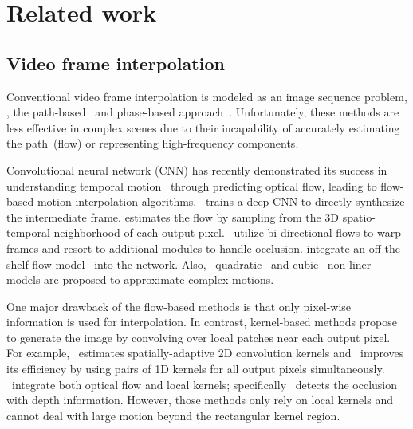 \documentclass[final]{cvpr}
\begin{document}
\section{Related work}


\subsection{Video frame interpolation}



Conventional video frame interpolation is modeled as an image sequence problem, \eg, the path-based~\cite{mahajan2009moving} and phase-based approach~\cite{meyer2018phasenet,meyer2015phase}. Unfortunately, these methods are less effective in complex scenes due to their incapability of accurately estimating the path~(flow) or representing high-frequency components.

Convolutional neural network (CNN) has recently demonstrated its success in understanding temporal motion~\cite{dosovitskiy2015flownet,ilg2017flownet,raket2012motion,sun2018pwc,weinzaepfel2013deepflow,werlberger2011optical} through predicting optical flow, leading to flow-based motion interpolation algorithms. \cite{long2016learning}~trains a deep CNN to directly synthesize the intermediate frame. \cite{liu2017video} estimates the flow by sampling from the 3D spatio-temporal neighborhood of each output pixel. \cite{jiang2018super,park2020bmbc,xue2019video,yuan2019zoom}~utilize bi-directional flows to warp frames and resort to additional modules to handle occlusion. \cite{niklaus2018context,niklaus2020softmax} integrate an off-the-shelf flow model~\cite{sun2018pwc} into the network.
Also, ~quadratic~\cite{liu2020enhanced,xu2019quadratic} and cubic~\cite{chi2020all} non-liner models are proposed to approximate complex motions.


One major drawback of the flow-based methods is that only pixel-wise information is used for interpolation. 
In contrast, kernel-based methods propose to generate the image by convolving over local patches near each output pixel. For example, \cite{niklaus2017video_sepcov}~estimates  spatially-adaptive 2D convolution kernels and \cite{niklaus2017video}~improves its efficiency by using pairs of 1D kernels for all output pixels simultaneously.
\cite{bao2019depth,bao2019memc}~integrate both optical flow and local kernels; specifically~\cite{bao2019depth} detects the occlusion with depth information. However, those methods only rely on local kernels and cannot deal with large motion beyond the rectangular kernel region.
\end{document}
